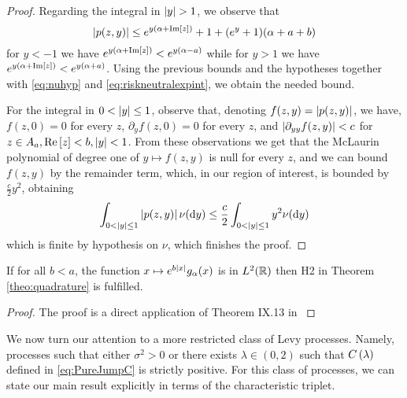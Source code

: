 \documentclass[11pt]{amsart}
\begin{document}
\begin{proposition}
\begin{proof}
Regarding the integral in ${\absval{y}> 1}$, we observe that
\begin{equation}
\left| {p(z,y)} \right|\leq e^{y(\alpha+\mathrm{Im}\left[z\right])}+1+(e^{y}+1)(\alpha+a+b)
\end{equation}
for $y<-1$ we have $e^{y(\alpha+\mathrm{Im}\left[z\right])}<e^{y(\alpha-a)}$ while for $y>1$ we have $e^{y(\alpha+\mathrm{Im}\left[z\right])}<e^{y(\alpha+a)}$. 
Using the previous bounds and the hypotheses together with \eqref{eq:nuhyp} and \eqref{eq:riskneutralexpint}, we obtain the needed bound.


For the integral in ${0<\left| {y} \right|\leq 1}$, observe that, denoting $f(z,y)=\left| {p(z,y)} \right|$, we have, $f(z,0)=0$ for every $z$, $\partial_y f(z,0)=0$ for every $z$, and $\left| {\partial_{yy}f(z,y)} \right|< c$ for $z\in A_{a}, \mathrm{Re}\left[z\right]<b, \left| {y} \right|<1$. From these observations we get that the McLaurin polynomial of degree one of $y\mapsto f(z,y)$ is null for every $z$, and we can bound $f(z,y)$ by the remainder term, which, in our region of interest, is bounded by $\frac{c}{2} y^2$, obtaining
\begin{equation}
\int_{0<\left| {y} \right|\leq 1} \left| {p(z,y)} \right|\nu(\textrm{d} y)\leq \frac{c}2 \int_{0<\left| {y} \right|\leq 1}y^2\nu(\textrm{d} y)
\end{equation}
which is finite by hypothesis on $\nu$, which finishes the proof.
\end{proof}
\end{proposition}

\begin{proposition}
If for all $b<a$, the function $x\mapsto e^{b\left| {x} \right|}{g_{\alpha}(x)}$ is in $L^2(\mathbb{R})$ then H2 in Theorem \ref{theo:quadrature} is fulfilled.
\end{proposition}
\begin{proof}
The proof is a direct application of Theorem IX.13 in \cite{reedsimon}
\end{proof}
We now turn our attention to a more restricted class of Levy processes. 
Namely, processes such that either $\sigma^2>0$ or there exists $\lambda \in (0,2)$ such that $C \left( {\lambda} \right)$ defined in \eqref{eq:PureJumpC} is strictly positive. 
For this class of processes, we can state our main result explicitly in terms of the characteristic triplet. 
\end{document}
